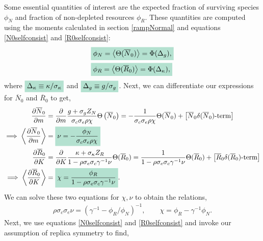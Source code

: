\documentclass[10pt]{article}
\newcommand{\mathcolorbox}[1]{\colorbox{hlcol}{$\displaystyle #1$}}
\newcommand{\eval}[1]{\left\langle #1 \right\rangle}
\begin{document}
Some essential quantities of interest are the expected fraction of surviving species $\phi_N$ and fraction of non-depleted resources $\phi_R$.
These quantities are computed using the moments calculated in section \ref{rampNormal} and equations \ref{N0selfconsist} and \ref{R0selfconsist}:
\begin{align}
	&\mathcolorbox{\phi_N =
	\eval{
		\Theta(\overline N_0)
	}
	=
	\Phi(\Delta_g),}
	\label{phiNselfconsist}
	\\
	&\mathcolorbox{\phi_R = 
	\eval{
		\Theta(\overline R_0)
	}
	=
	\Phi(\Delta_\kappa),}
	\label{phiRselfconsist}
\end{align}
where $\mathcolorbox{\Delta_\kappa \equiv \kappa/\sigma_\kappa}$ and $\mathcolorbox{\Delta_g \equiv g/\sigma_g}$.
Next, we can differentiate our expressions for $\overline N_0$ and $\overline R_0$ to get,
\begin{align}
	\nonumber
	\frac{\partial \overline N_0}{\partial m}
	&=
	\frac{\partial}{\partial m}
	\frac{g + \sigma_g Z_N}{\sigma_c \sigma_e \rho \chi}
	\Theta \left(\overline N_0\right)
	=
	-
	\frac{1}{\sigma_c \sigma_e \rho \chi}
	\Theta(\overline N_0)
	+
	\left[\text{$\overline N_0 \delta(\overline N_0)$-term}\right]
	\\
	\implies
	\eval{\frac{\partial \overline N_0}{\partial m}}
	&=
	\mathcolorbox{
	\nu
	=
	-\frac{\phi_N}{\sigma_c \sigma_e \rho \chi}}
	\label{nuselfconsist}
	\\
	\nonumber
	\frac{\partial \overline R_0}{\partial K}
	&=
	\frac{\partial }{\partial K}
	\frac{\kappa + \sigma_\kappa Z_R}{1-\rho \sigma_e \sigma_c \gamma^{-1}\nu}
	\Theta(\overline R_0)
	=
	\frac{1}{1-\rho \sigma_e \sigma_c \gamma^{-1}\nu}
	\Theta(\overline R_0)
	+
	\left[\text{$\overline R_0 \delta(\overline R_0)$-term}\right]
	\\
	\implies
	\eval{
		\frac{\partial \overline R_0}{\partial K}
	}
	&=
	\mathcolorbox{
	\chi
	=
	\frac{\phi_R}{1-\rho \sigma_e \sigma_c \gamma^{-1}\nu}
	}.
	\label{chiselfconsist}
\end{align}
We can solve these two equations for $\chi,\nu$ to obtain the relations,
\begin{align}
	\rho \sigma_c \sigma_e\nu = 
	\left(
		\gamma^{-1}-\phi_R/\phi_N
	\right)^{-1},
	\qquad
	\chi =
	\phi_R - \gamma^{-1}\phi_N.
	\label{solvedSuscept}
\end{align}
Next, we use equations \ref{N0selfconsist} and \ref{R0selfconsist} and invoke our assumption of replica symmetry to find,
\end{document}
